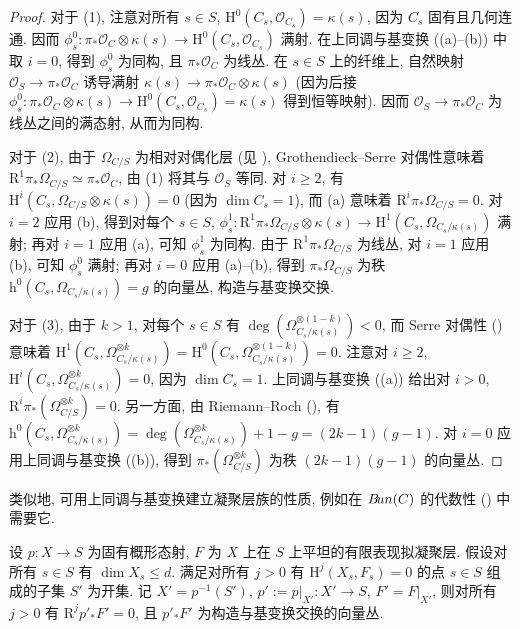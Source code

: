 \begin{proof}
对于 (1), 注意对所有 $s\in S$, $\mathrm H^0(C_s,\mathcal O_{C_s})=\kappa(s)$, 因为 $C_s$ 固有且几何连通. 因而 $\phi_s^0:\pi_*\mathcal O_C\otimes\kappa(s)\to\mathrm H^0(C_s,\mathcal O_{C_s})$ 满射. 在上同调与基变换 ((a)--(b)) 中取 $i=0$, 得到 $\phi_s^0$ 为同构, 且 $\pi_*\mathcal O_C$ 为线丛. 在 $s\in S$ 上的纤维上, 自然映射 $\mathcal O_S\to\pi_*\mathcal O_C$ 诱导满射 $\kappa(s)\to\pi_*\mathcal O_C\otimes\kappa(s)$ (因为后接 $\phi_s^0:\pi_*\mathcal O_C\otimes\kappa(s)\to\mathrm H^0(C_s,\mathcal O_{C_s})=\kappa(s)$ 得到恒等映射). 因而 $\mathcal O_S\to\pi_*\mathcal O_C$ 为线丛之间的满态射, 从而为同构.

对于 (2), 由于 $\Omega_{C/S}$ 为相对对偶化层 (见 \cite[\S$6.4$]{Liu02}), Grothendieck--Serre 对偶性意味着 $\mathrm R^1\pi_*\Omega_{C/S}\simeq\pi_*\mathcal O_C$, 由 (1) 将其与 $\mathcal O_S$ 等同. 对 $i\geq2$, 有 $\mathrm H^i(C_s,\Omega_{C/S}\otimes\kappa(s))=0$ (因为 $\dim C_s=1$), 而 (a) 意味着 $\mathrm R^i\pi_*\Omega_{C/S}=0$. 对 $i=2$ 应用 (b), 得到对每个 $s\in S$, $\phi_s^1:\mathrm R^1\pi_*\Omega_{C/S}\otimes\kappa(s)\to\mathrm H^1(C_s,\Omega_{C_s/\kappa(s)})$ 满射; 再对 $i=1$ 应用 (a), 可知 $\phi_s^1$ 为同构. 由于 $\mathrm R^1\pi_*\Omega_{C/S}$ 为线丛, 对 $i=1$ 应用 (b), 可知 $\phi_s^0$ 满射; 再对 $i=0$ 应用 (a)--(b), 得到 $\pi_*\Omega_{C/S}$ 为秩 $\mathrm h^0(C_s,\Omega_{C_s/\kappa(s)})=g$ 的向量丛, 构造与基变换交换.

对于 (3), 由于 $k>1$, 对每个 $s\in S$ 有 $\deg(\Omega_{C_s/\kappa(s)}^{\otimes(1-k)})<0$, 而 Serre 对偶性 () 意味着 $\mathrm H^1(C_s,\Omega_{C_s/\kappa(s)}^{\otimes k})=\mathrm H^0(C_s,\Omega_{C_s/\kappa(s)}^{\otimes(1-k)})=0$. 注意对 $i\geq2$, $\mathrm H^i(C_s,\Omega_{C_s/\kappa(s)}^{\otimes k})=0$, 因为 $\dim C_s=1$. 上同调与基变换 ((a)) 给出对 $i>0$, $\mathrm R^i\pi_*(\Omega_{C/S}^{\otimes k})=0$. 另一方面, 由 Riemann--Roch (), 有 $\mathrm h^0(C_s,\Omega_{C_s/\kappa(s)}^{\otimes k})=\deg(\Omega_{C_s/\kappa(s)}^{\otimes k})+1-g=(2k-1)(g-1)$. 对 $i=0$ 应用上同调与基变换 ((b)), 得到 $\pi_*(\Omega_{C/S}^{\otimes k})$ 为秩 $(2k-1)(g-1)$ 的向量丛.
\end{proof}
类似地, 可用上同调与基变换建立凝聚层族的性质, 例如在 $B\!un(C)$ 的代数性 () 中需要它.
\begin{proposition}\label{src:A.6.12}
设 $p:X\to S$ 为固有概形态射, $F$ 为 $X$ 上在 $S$ 上平坦的有限表现拟凝聚层. 假设对所有 $s\in S$ 有 $\dim X_s\leq d$. 满足对所有 $j>0$ 有 $\mathrm H^j(X_s,F_s)=0$ 的点 $s\in S$ 组成的子集 $S'$ 为开集. 记 $X'=p^{-1}(S')$, $p':=p|_{X'}:X'\to S$, $F'=F|_{X'}$, 则对所有 $j>0$ 有 $\mathrm R^jp'_*F'=0$, 且 $p'_*F'$ 为构造与基变换交换的向量丛.
\end{proposition}
